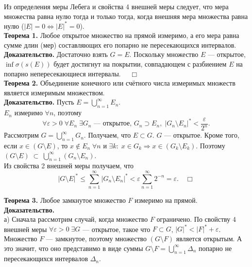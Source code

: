 \documentclass[12pt,a4paper, titlepage]{article}
\begin{document}
Из определения меры Лебега и свойства 4 внешней меры следует, что мера множества равна нулю тогда и только тогда, когда внешняя мера множества равна нулю ($|E| = 0 \Leftrightarrow |E|^* = 0$).\\












\textbf{Теорема 1.} Любое открытое множество на прямой измеримо, а его мера равна сумме длин (мер) составляющих его попарно не пересекающихся интервалов.\\
\textbf{Доказательство.} Достаточно взять $G = E$. Поскольку множество $E$ --- открытое, $\inf{\sigma(s(E))}$ будет достигнут на покрытии, совпадающем с разбиением $E$ на попарно непересекающиеся интервалы. $\quad \Box$\\

\textbf{Теорема 2.} Объединение конечного или счётного числа измеримых множеств является измеримым множеством.\smallskip\\
\textbf{Доказательство.} Пусть $E = \bigcup\limits_{n=1}^\infty E_n $.\\
$E_n$ измеримо $\forall n$, поэтому
$$
\forall \varepsilon > 0 \; \forall E_n \; \exists G_n \mbox{ --- открытое, } G_n \supset E_n, \; |G_n \setminus E_n|^* < \frac{\varepsilon}{2^n}.
$$
Рассмотрим $G = \bigcup\limits_{n=1}^\infty G_n $. Получаем, что $E \subset G$. $G$ --- открытое. Кроме того, если $x \in (G \setminus E)$, то $x \not \in E_n \; \forall n \text{ и } \exists k: \; x \in G_k \Rightarrow x \in (G_k \setminus E_k)$. Поэтому $(G \setminus E) \; \subset \; \bigcup\limits_{n=1}^\infty (G_n \setminus E_n)$.\\

Из свойства 2 внешней меры получаем, что
$$
|G \setminus E |^* \leqslant \sum_{n=1}^\infty |G_n \setminus E_n|^* < \varepsilon \sum_{n=1}^\infty 2^{-n} = \varepsilon. \quad \Box
$$ 

\textbf{Теорема 3.} Любое замкнутое множество $F$ измеримо на прямой.\\
\textbf{Доказательство.}\\
а) Сначала рассмотрим случай, когда множество $F$ ограничено. По свойству 4 внешней меры $\forall \varepsilon > 0 \; \exists G$ --- открытое, такое что $F \subset G$, $|G|^* < |F|^* + \varepsilon$. Множество $F$ --- замкнутое, поэтому множество $(G \setminus F)$ является открытым. А это значит, что оно представимо в виде суммы $G \setminus F = \bigcup_{n=1}^\infty \Delta_n$ попарно не пересекающихся интервалов $\Delta_n$.\\
\end{document}
